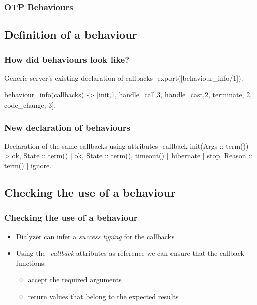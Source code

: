 \documentclass{beamer}
\begin{document}
\begin{frame}
  \frametitle{OTP Behaviours}
  
\end{frame}

\subsection{Definition of a behaviour}

\begin{frame}[fragile]
  \frametitle{How did behaviours look like?}
\begin{code}{Generic server's existing declaration of callbacks}
-export([behaviour_info/1]).

behaviour_info(callbacks) ->
  [{init,1}, {handle_call,3}, {handle_cast,2},
   {terminate, 2}, {code_change, 3}].

\end{code}
\end{frame}

\begin{frame}[fragile]
  \frametitle{New declaration of behaviours}
\begin{code}{Declaration of the same callbacks using attributes}
-callback init(Args :: term()) ->
    {ok, State :: term()} |
    {ok, State :: term(), timeout() | hibernate} |
    {stop, Reason :: term()} | 
    ignore.

\end{code}
\end{frame}

\subsection{Checking the use of a behaviour}

\begin{frame}
  \frametitle{Checking the use of a behaviour}
  \begin{itemize}
    \item Dialyzer can infer a \emph{success typing} for the callbacks
      \pause
    \item Using the \emph{-callback} attributes as reference we can
      ensure that the callback functions:
      \begin{itemize}
        \item accept the required arguments
        \item return values that belong to the expected results
      \end{itemize}
  \end{itemize}
\end{frame}
\end{document}
